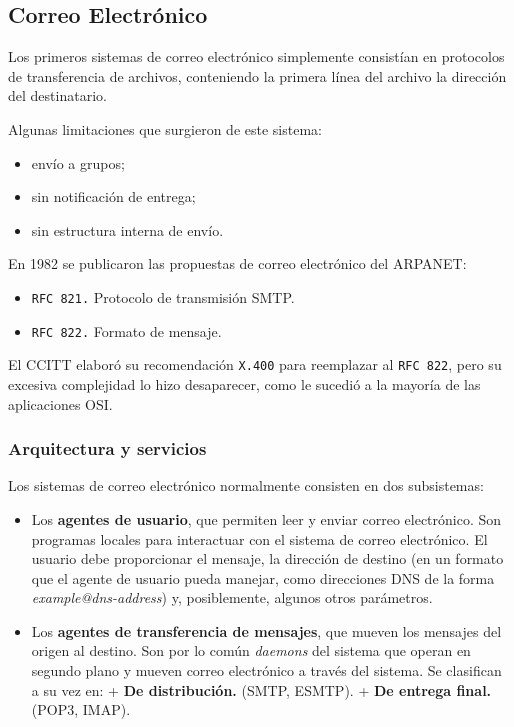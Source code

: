 \documentclass[10pt,a4paper]{article}
\begin{document}
\subsection{Correo Electrónico}

Los primeros sistemas de correo electrónico simplemente consistían en protocolos de transferencia de archivos, conteniendo la primera línea del archivo la dirección del destinatario.

Algunas limitaciones que surgieron de este sistema:
\begin{itemize}
\item envío a grupos;
\item sin notificación de entrega;
\item sin estructura interna de envío.
\end{itemize}

En 1982 se publicaron las propuestas de correo electrónico del ARPANET:
\begin{itemize}
\item \texttt{RFC 821.} Protocolo de transmisión SMTP.
\item \texttt{RFC 822.} Formato de mensaje.
\end{itemize}

El CCITT elaboró su recomendación \texttt{X.400} para reemplazar al \texttt{RFC 822}, pero su excesiva complejidad lo hizo desaparecer, como le sucedió a la mayoría de las aplicaciones OSI.

\subsubsection{Arquitectura y servicios}

Los sistemas de correo electrónico normalmente consisten en dos subsistemas:

\begin{itemize}
\item Los \textbf{agentes de usuario}, que permiten leer y enviar correo electrónico. Son programas locales para interactuar con el sistema de correo electrónico. El usuario debe proporcionar el mensaje, la dirección de destino (en un formato que el agente de usuario pueda manejar, como direcciones DNS de la forma \textit{example@dns-address}) y, posiblemente, algunos otros parámetros.
\item Los \textbf{agentes de transferencia de mensajes}, que mueven los mensajes del origen al destino. Son por lo común \textit{daemons} del sistema que operan en segundo plano y mueven correo electrónico a través del sistema. Se clasifican a su vez en:
\subitem + \textbf{De distribución.} (SMTP, ESMTP).
\subitem + \textbf{De entrega final.} (POP3, IMAP).
\end{itemize}
\end{document}

